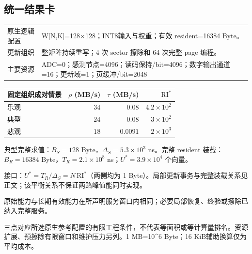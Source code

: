 \subsection*{统一结果卡}
\begingroup\small
\noindent\begin{tabularx}{\textwidth}{@{}p{24mm}X@{}}\toprule
原生逻辑配置 & W[N,K]=128×128；INT8输入与权重；有效 resident=16384 Byte。\\
更新组织 & 整矩阵持续重写；4 次 sector 擦除和 64 次完整 page 编程。\\
主要资源 & ADC=0；感测节点=4096；读码保持/bit=4096；数字输出通道=16；更新域=1；页缓冲/bit=2048\\
\bottomrule\end{tabularx}
\vspace{3mm}
\begin{center}\begin{tabular}{@{}lrrr@{}}\toprule
固定组织成对情景 & $\rho$ (MB/s) & $\tau$ (MB/s) & $\mathrm{RI}^{*}$\\\midrule
乐观 & $34$ & $0.08$ & $4.2\times10^{2}$\\
典型 & $24$ & $0.08$ & $3\times10^{2}$\\
悲观 & $18$ & $0.0091$ & $2\times10^{3}$\\
\bottomrule\end{tabular}\end{center}
\noindent 典型完整求值：$B_S=128$ Byte，$\Delta_S=5.3\times10^{3}$ ns。完整 resident 装载：$B_R=16384$ Byte，$T_R=2.1\times10^{8}$ ns；$U^*=3.9\times10^{4}$ 个向量。
\par\smallskip\noindent 接口：$U^*=T_R/\Delta_S=N\,\mathrm{RI}^*$（两侧均为 1 Byte）。局部更新事务与完整装载关系见正文；该平衡关系不保证两路峰值能同时实现。
\par\smallskip\noindent 原始能力与长期有效能力在所声明服务窗口内相同；必要局部恢复、终验或擦除已纳入完整服务。
\par\smallskip\noindent 三点对应所选原生参考配置的有限工程条件，不代表等面积或等计算量排名。资源扩展、预擦除有限窗口和维护压力另列。1 MB=10\textasciicircum{}6 Byte；16 KiB辅助换算仅为平均成本。
\endgroup
\clearpage
